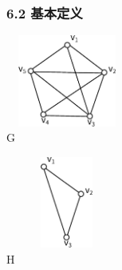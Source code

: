 \documentclass{beamer}
\begin{document}
\begin{CJK}{UTF8}{gbsn}
\begin{frame}
  \frametitle{6.2 基本定义}
    \begin{minipage}[c]{0.4\textwidth}
\includegraphics[width=4cm,height=3cm]{subgraph1} \\ \centering G 
    \end{minipage}\hspace{2cm}
    \begin{minipage}[c]{0.4\textwidth}
\includegraphics[width=4cm,height=3cm]{induced} \\ \centering H 
    \end{minipage}


\end{frame}
\end{CJK}
\end{document}
